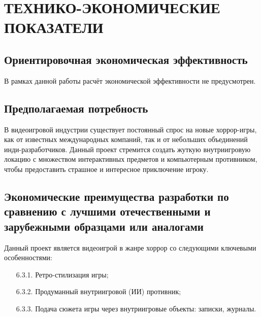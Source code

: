 \section{ТЕХНИКО-ЭКОНОМИЧЕСКИЕ ПОКАЗАТЕЛИ}

\subsection{Ориентировочная экономическая эффективность}

В рамках данной работы расчёт экономической эффективности не предусмотрен.

\subsection{Предполагаемая потребность}

В видеоигровой индустрии существует постоянный спрос на новые хоррор-игры, как от известных международных компаний, так и от небольших объединений инди-разработчиков. Данный проект стремится создать жуткую внутриигровую локацию с множеством интерактивных предметов и компьютерным противником, чтобы предоставить страшное и интересное приключение игроку.

\subsection{Экономические преимущества разработки по сравнению с лучшими отечественными и зарубежными образцами или аналогами}

Данный проект является видеоигрой в жанре хоррор со следующими ключевыми особенностями:

\begin{enumerate}
    \item[6.3.1.] Ретро-стилизация игры;
    \item[6.3.2.] Продуманный внутриигровой (ИИ) противник;
    \item[6.3.3.] Подача сюжета игры через внутриигровые объекты: записки, журналы.
\end{enumerate}